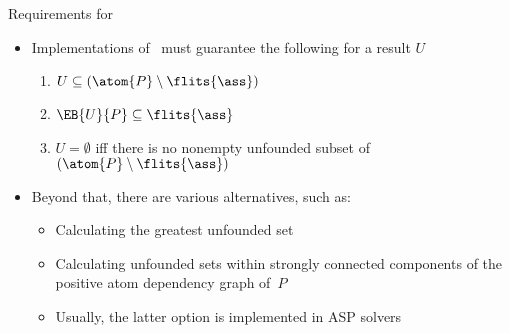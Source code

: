 \begin{frame}{Requirements for \UnFoundedSet}
\begin{itemize}
\item<1-> Implementations of \UnFoundedSet\ must guarantee the following for a result $U$
  \begin{enumerate}
  \item $U\subseteq (\atom{P}\setminus\flits{\ass})$
  \item $\EB{U}{P}\subseteq\flits{\ass}$
  \item $U=\emptyset$ iff there is no nonempty unfounded subset of $(\atom{P}\setminus\flits{\ass})$
  \end{enumerate}

\item<2-> Beyond that, there are various alternatives, such as:
  \begin{itemize}
  \item Calculating the greatest unfounded set
  \item Calculating unfounded sets within strongly connected components
        of the positive atom dependency graph of~$P$
        \medskip
  \item Usually, the latter option is implemented in ASP solvers
  \end{itemize}
\end{itemize}
\end{frame}
